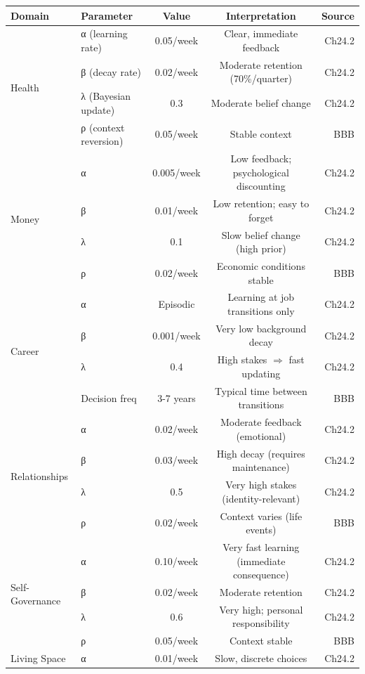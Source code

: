 \begin{center}
\begin{tabular}{@{}p{2cm}lccr@{}}
\toprule
\textbf{Domain} & \textbf{Parameter} & \textbf{Value} & \textbf{Interpretation} & \textbf{Source} \\
\midrule
\multirow{4}{*}{Health} & α (learning rate) & 0.05/week & Clear, immediate feedback & Ch24.2 \\
& β (decay rate) & 0.02/week & Moderate retention (70\%/quarter) & Ch24.2 \\
& λ (Bayesian update) & 0.3 & Moderate belief change & Ch24.2 \\
& ρ (context reversion) & 0.05/week & Stable context & BBB \\
\midrule
\multirow{4}{*}{Money} & α & 0.005/week & Low feedback; psychological discounting & Ch24.2 \\
& β & 0.01/week & Low retention; easy to forget & Ch24.2 \\
& λ & 0.1 & Slow belief change (high prior) & Ch24.2 \\
& ρ & 0.02/week & Economic conditions stable & BBB \\
\midrule
\multirow{4}{*}{Career} & α & Episodic & Learning at job transitions only & Ch24.2 \\
& β & 0.001/week & Very low background decay & Ch24.2 \\
& λ & 0.4 & High stakes $\Rightarrow$ fast updating & Ch24.2 \\
& Decision freq & 3-7 years & Typical time between transitions & BBB \\
\midrule
\multirow{4}{*}{Relationships} & α & 0.02/week & Moderate feedback (emotional) & Ch24.2 \\
& β & 0.03/week & High decay (requires maintenance) & Ch24.2 \\
& λ & 0.5 & Very high stakes (identity-relevant) & Ch24.2 \\
& ρ & 0.02/week & Context varies (life events) & BBB \\
\midrule
\multirow{4}{*}{Self-Governance} & α & 0.10/week & Very fast learning (immediate consequence) & Ch24.2 \\
& β & 0.02/week & Moderate retention & Ch24.2 \\
& λ & 0.6 & Very high; personal responsibility & Ch24.2 \\
& ρ & 0.05/week & Context stable & BBB \\
\midrule
\multirow{4}{*}{Living Space} & α & 0.01/week & Slow, discrete choices & Ch24.2 \\

\end{tabular}
\end{center}
